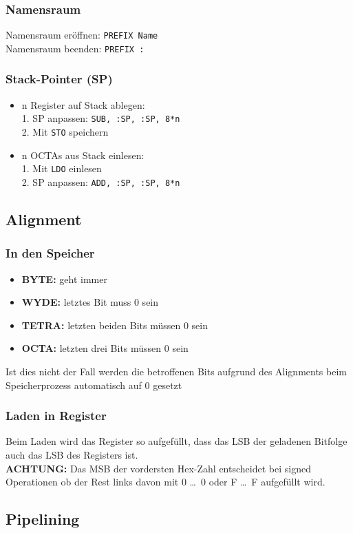 \documentclass[german, threecolumn, 8pt]{latex4ei/latex4ei_sheet}
\begin{document}
\subsubsection{Namensraum}
Namensraum eröffnen: \texttt{PREFIX Name} \\
Namensraum beenden: \texttt{PREFIX :}
\subsubsection{Stack-Pointer (SP)}
\begin{itemize}
\item n Register auf Stack ablegen: \\
1. SP anpassen: \texttt{SUB, :SP, :SP, 8*n}\\
2. Mit \texttt{STO} speichern
\item n OCTAs aus Stack einlesen: \\
1. Mit \texttt{LDO} einlesen\\
2. SP anpassen: \texttt{ADD, :SP, :SP, 8*n}
\end{itemize}
\subsection{Alignment}
\subsubsection{In den Speicher}
\begin{itemize}\itemsep0pt
\item \textbf{BYTE:} geht immer
\item \textbf{WYDE:} letztes Bit muss 0 sein 
\item \textbf{TETRA:} letzten beiden Bits müssen 0 sein 
\item \textbf{OCTA:} letzten drei Bits müssen 0 sein 
\end{itemize}
Ist dies nicht der Fall werden die betroffenen Bits aufgrund des Alignments beim Speicherprozess automatisch auf 0 gesetzt
\subsubsection{Laden in Register}
Beim Laden wird das Register so aufgefüllt, dass das LSB der geladenen Bitfolge auch das LSB des Registers ist. \\
\textbf{ACHTUNG:} Das MSB der vordersten Hex-Zahl entscheidet bei signed Operationen ob der Rest links davon mit 0 \dots \ 0 oder F \dots \ F aufgefüllt wird.
\subsection{Pipelining}
\end{document}
